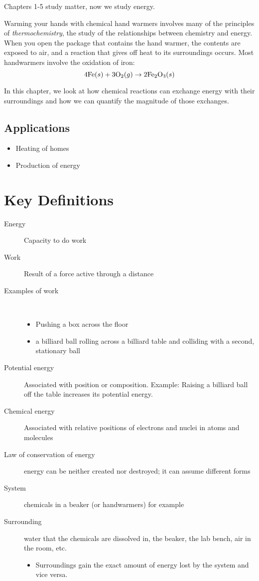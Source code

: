 \documentclass[
	chapter=6,
	title={Thermochemistry},
	showanswers=true,
]{chem122notes}
\begin{document}
Chapters 1-5 study matter, now we study energy.

Warming your hands with chemical hand warmers involves many of the principles of \emph{thermochemistry}, the study of the relationships between chemistry and energy.
When you open the package that contains the hand warmer, the contents are exposed to air, and a reaction that gives off heat to its surroundings occurs.
Most handwarmers involve the oxidation of iron:
\[ 4\element{Fe}(s) + 3\element{O}[2](g) \rightarrow 2\element{Fe}[2]\element{O}[3] (s) \]

In this chapter, we look at how chemical reactions can exchange energy with their surroundings and how we can quantify the magnitude of those exchanges.

\subsection{Applications}\label{subsec:applications}
\begin{itemize}
	\item Heating of homes
	\item Production of energy
\end{itemize}

\section{Key Definitions}\label{sec:key-definitions}
\begin{description}
	\item[Energy] Capacity to do work
	\item[Work] Result of a force active through a distance
	\item[Examples of work]~
	\begin{itemize}
		\item Pushing a box across the floor
		\item a billiard ball rolling across a billiard table and colliding with a second, stationary ball
	\end{itemize}
	\item[Potential energy] Associated with position or composition. Example: Raising a billiard ball off the table increases its potential energy.
	\item[Chemical energy] Associated with relative positions of electrons and nuclei in atoms and molecules
	\item[Law of conservation of energy] energy can be neither created nor destroyed; it can assume different forms
	\item[System] chemicals in a beaker (or handwarmers) for example
	\item[Surrounding] water that the chemicals are dissolved in, the beaker, the lab bench, air in the room, etc.
	\begin{itemize}
		\item Surroundings gain the exact amount of energy lost by the system and vice versa.
	\end{itemize}
\end{description}
\end{document}
